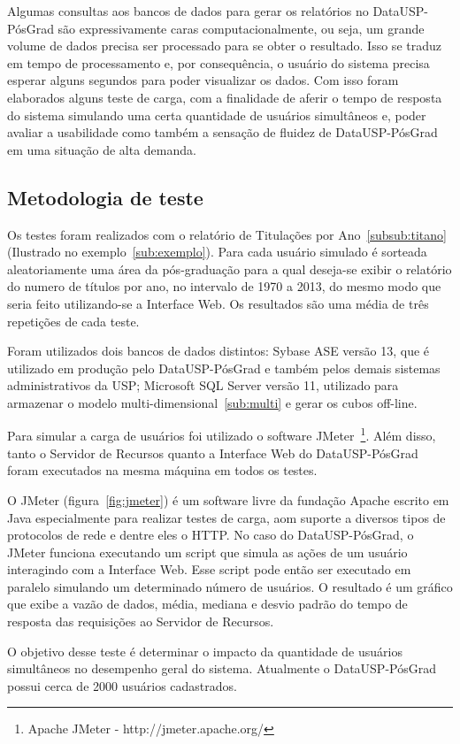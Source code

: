 Algumas consultas aos bancos de dados para gerar os relatórios no DataUSP-PósGrad são expressivamente caras computacionalmente, ou seja, um grande volume de dados precisa ser processado para se obter o resultado. Isso se traduz em tempo de processamento e, por consequência, o usuário do sistema precisa esperar alguns segundos para poder visualizar os dados. Com isso foram elaborados alguns teste de carga, com a finalidade de aferir o tempo de resposta do sistema simulando uma certa quantidade de usuários simultâneos e, poder avaliar a usabilidade como também a sensação de fluidez de DataUSP-PósGrad em uma situação de alta demanda.

\subsection{Metodologia de teste}

Os testes foram realizados com o relatório de Titulações por Ano~\ref{subsub:titano}(Ilustrado no exemplo~\ref{sub:exemplo}). Para cada usuário simulado é sorteada aleatoriamente uma área da pós-graduação para a qual deseja-se exibir o relatório do numero de títulos por ano, no intervalo de 1970 a 2013, do mesmo modo que seria feito utilizando-se a Interface Web. Os resultados são uma média de três repetições de cada teste.
\par
Foram utilizados dois bancos de dados distintos: Sybase ASE versão 13, que é utilizado em produção pelo DataUSP-PósGrad e também pelos demais sistemas administrativos da USP; Microsoft SQL Server versão 11, utilizado para armazenar o modelo multi-dimensional~\ref{sub:multi} e gerar os cubos off-line. 
\par
Para simular a carga de usuários foi utilizado o software JMeter~\footnote{Apache JMeter - http://jmeter.apache.org/}. Além disso, tanto o Servidor de Recursos quanto a Interface Web do DataUSP-PósGrad foram executados na mesma máquina em todos os testes.
\par
O JMeter (figura~\ref{fig:jmeter}) é um software livre da fundação Apache escrito em Java especialmente para realizar testes de carga, aom suporte a diversos tipos de protocolos de rede e dentre eles o HTTP. No caso do DataUSP-PósGrad, o JMeter funciona executando um script que simula as ações de um usuário interagindo com a Interface Web. Esse script pode então ser executado em paralelo simulando um determinado número de usuários. O resultado é um gráfico que exibe a vazão de dados, média, mediana e desvio padrão do tempo de resposta das requisições ao Servidor de Recursos. 
\par
O objetivo desse teste é determinar o impacto da quantidade de usuários simultâneos no desempenho geral do sistema. Atualmente o DataUSP-PósGrad possui cerca de 2000 usuários cadastrados.

